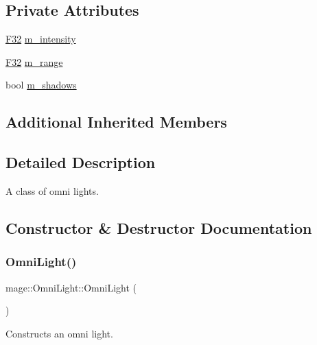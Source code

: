 \subsection*{Private Attributes}
\begin{DoxyCompactItemize}
\item 
\hyperlink{namespacemage_aa97e833b45f06d60a0a9c4fc22ae02c0}{F32} \hyperlink{classmage_1_1_omni_light_aa0cbdebabf3ce0d8bbaeff7cf88cadd0}{m\+\_\+intensity}
\item 
\hyperlink{namespacemage_aa97e833b45f06d60a0a9c4fc22ae02c0}{F32} \hyperlink{classmage_1_1_omni_light_a0427a9c7f90750c645cd67ef0bafce47}{m\+\_\+range}
\item 
bool \hyperlink{classmage_1_1_omni_light_a63e5dab12be5021815e98c81dd9aed6a}{m\+\_\+shadows}
\end{DoxyCompactItemize}
\subsection*{Additional Inherited Members}


\subsection{Detailed Description}
A class of omni lights. 

\subsection{Constructor \& Destructor Documentation}
\hypertarget{classmage_1_1_omni_light_a7e415936a810268d874f198aa2a9e5d9}{}\label{classmage_1_1_omni_light_a7e415936a810268d874f198aa2a9e5d9} 
\subsubsection{\texorpdfstring{Omni\+Light()}{OmniLight()}\hspace{0.1cm}{\footnotesize\ttfamily [1/3]}}
{\footnotesize\ttfamily mage\+::\+Omni\+Light\+::\+Omni\+Light (\begin{DoxyParamCaption}{ }\end{DoxyParamCaption})\hspace{0.3cm}{\ttfamily [noexcept]}}

Constructs an omni light. \hypertarget{classmage_1_1_omni_light_ac52de90bfbdc72d50b1f258f734b5fc9}{}\label{classmage_1_1_omni_light_ac52de90bfbdc72d50b1f258f734b5fc9} 
